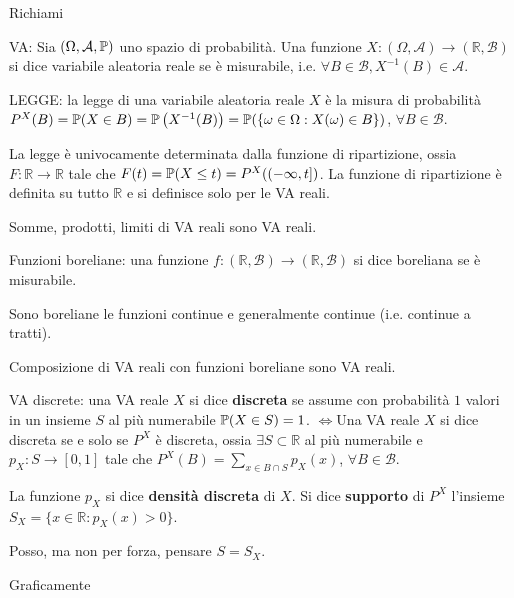 
\ParteEsercizi

Richiami

VA: Sia $(\Omega ,\mathcal{A} ,\mathbb{P})$ uno spazio di probabilità. Una funzione $X:(\Omega ,\mathcal{A})\rightarrow (\mathbb{R} ,\mathcal{B})$ si dice variabile aleatoria reale se è misurabile, i.e. $\forall B\in \mathcal{B} ,X^{-1}(B) \in \mathcal{A}$.

LEGGE: la legge di una variabile aleatoria reale $X$ è la misura di probabilità $P^{X}(B) =\mathbb{P}(X\in B) =\mathbb{P}\left(X^{-1}(B)\right) =\mathbb{P}(\{\omega \in \Omega :X(\omega) \in B\})$, $\forall B\in \mathcal{B}$.
\begin{oss}
	La legge è univocamente determinata dalla funzione di ripartizione, ossia $F:\mathbb{R}\rightarrow \mathbb{R}$ tale che $F(t) =\mathbb{P}(X\leq t) =P^{X}((-\infty ,t])$. La funzione di ripartizione è definita su tutto $\mathbb{R}$ e si definisce solo per le VA reali.
\end{oss}
\begin{oss}
Somme, prodotti, limiti di VA reali sono VA reali.
\end{oss}
Funzioni boreliane: una funzione $f:(\mathbb{R} ,\mathcal{B})\rightarrow (\mathbb{R} ,\mathcal{B})$ si dice boreliana se è misurabile.
\begin{oss}
Sono boreliane le funzioni continue e generalmente continue (i.e. continue a tratti).
\end{oss}
\begin{oss}
Composizione di VA reali con funzioni boreliane sono VA reali.
\end{oss}
VA discrete: una VA reale $X$ si dice \textbf{discreta} se assume con probabilità $1$ valori in un insieme $S$ al più numerabile $\mathbb{P}(X\in S) =1$. $\iff $Una VA reale $X$ si dice discreta se e solo se $P^{X}$ è discreta, ossia $\exists S\subset \mathbb{R}$ al più numerabile e $p_{X} :S\rightarrow [0,1]$ tale che $P^{X}(B) =\sum\limits_{x\in B\cap S} p_{X}(x)$, $\forall B\in \mathcal{B}$.

La funzione $p_{X}$ si dice \textbf{densità discreta} di $X$. Si dice \textbf{supporto} di $P^{X}$ l'insieme $S_{X} =\{x\in \mathbb{R} :p_{X}(x)  >0\}$.
\begin{oss}
Posso, ma non per forza, pensare $S=S_{X}$.
\end{oss}
Graficamente



